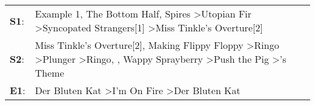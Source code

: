 \begin{supertabular}{p{0.03\textwidth}p{0.92\textwidth}}
 \textbf{S1}:  &                                                                                                                                Example 1\textsuperscript{}, \enspace The Bottom Half\textsuperscript{}, \enspace Spires\textsuperscript{} \textgreater \enspace Utopian Fir\textsuperscript{} \textgreater \enspace Syncopated Strangers[1]\textsuperscript{} \textgreater \enspace Miss Tinkle's Overture[2]\textsuperscript{}  \enspace  \\
 \textbf{S2}:  &  Miss Tinkle's Overture[2]\textsuperscript{}, \enspace Making Flippy Floppy\textsuperscript{} \textgreater \enspace Ringo\textsuperscript{} \textgreater \enspace Plunger\textsuperscript{} \textgreater \enspace Ringo\textsuperscript{}, \textsuperscript{}, \enspace Wappy Sprayberry\textsuperscript{} \textgreater \enspace Push the Pig\textsuperscript{} \textgreater {}'s Theme\textsuperscript{}  \enspace  \\
 \textbf{E1}:  &                                                                                                                                                                                                                                                                                     Der Bluten Kat\textsuperscript{} \textgreater \enspace I'm On Fire\textsuperscript{} \textgreater \enspace Der Bluten Kat\textsuperscript{}  \enspace  \\
\end{supertabular}

